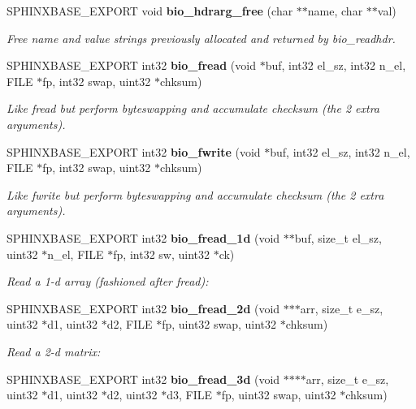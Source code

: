 \begin{DoxyCompactItemize}
\item 
\-S\-P\-H\-I\-N\-X\-B\-A\-S\-E\-\_\-\-E\-X\-P\-O\-R\-T void {\bf bio\-\_\-hdrarg\-\_\-free} (char $\ast$$\ast$name, char $\ast$$\ast$val)
\begin{DoxyCompactList}\small\item\em \-Free name and value strings previously allocated and returned by bio\-\_\-readhdr. \end{DoxyCompactList}\item 
\-S\-P\-H\-I\-N\-X\-B\-A\-S\-E\-\_\-\-E\-X\-P\-O\-R\-T int32 {\bf bio\-\_\-fread} (void $\ast$buf, int32 el\-\_\-sz, int32 n\-\_\-el, \-F\-I\-L\-E $\ast$fp, int32 swap, uint32 $\ast$chksum)
\begin{DoxyCompactList}\small\item\em \-Like fread but perform byteswapping and accumulate checksum (the 2 extra arguments). \end{DoxyCompactList}\item 
\-S\-P\-H\-I\-N\-X\-B\-A\-S\-E\-\_\-\-E\-X\-P\-O\-R\-T int32 {\bf bio\-\_\-fwrite} (void $\ast$buf, int32 el\-\_\-sz, int32 n\-\_\-el, \-F\-I\-L\-E $\ast$fp, int32 swap, uint32 $\ast$chksum)
\begin{DoxyCompactList}\small\item\em \-Like fwrite but perform byteswapping and accumulate checksum (the 2 extra arguments). \end{DoxyCompactList}\item 
\-S\-P\-H\-I\-N\-X\-B\-A\-S\-E\-\_\-\-E\-X\-P\-O\-R\-T int32 {\bf bio\-\_\-fread\-\_\-1d} (void $\ast$$\ast$buf, size\-\_\-t el\-\_\-sz, uint32 $\ast$n\-\_\-el, \-F\-I\-L\-E $\ast$fp, int32 sw, uint32 $\ast$ck)
\begin{DoxyCompactList}\small\item\em \-Read a 1-\/d array (fashioned after fread)\-: \end{DoxyCompactList}\item 
\-S\-P\-H\-I\-N\-X\-B\-A\-S\-E\-\_\-\-E\-X\-P\-O\-R\-T int32 {\bf bio\-\_\-fread\-\_\-2d} (void $\ast$$\ast$$\ast$arr, size\-\_\-t e\-\_\-sz, uint32 $\ast$d1, uint32 $\ast$d2, \-F\-I\-L\-E $\ast$fp, uint32 swap, uint32 $\ast$chksum)
\begin{DoxyCompactList}\small\item\em \-Read a 2-\/d matrix\-: \end{DoxyCompactList}\item 
\-S\-P\-H\-I\-N\-X\-B\-A\-S\-E\-\_\-\-E\-X\-P\-O\-R\-T int32 {\bf bio\-\_\-fread\-\_\-3d} (void $\ast$$\ast$$\ast$$\ast$arr, size\-\_\-t e\-\_\-sz, uint32 $\ast$d1, uint32 $\ast$d2, uint32 $\ast$d3, \-F\-I\-L\-E $\ast$fp, uint32 swap, uint32 $\ast$chksum)

\end{DoxyCompactItemize}
